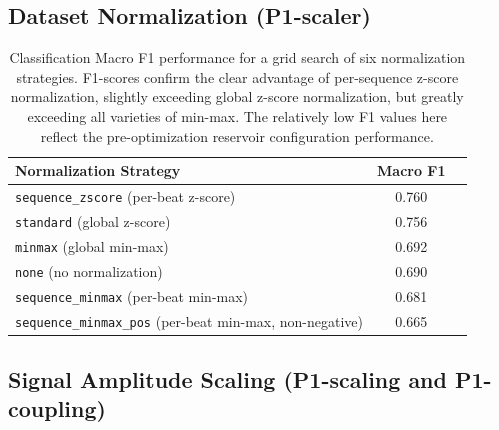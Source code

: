 \documentclass[journal=asbcd6,manuscript=suppinfo]{achemso}
\begin{document}
\subsection{Dataset Normalization (P1-scaler)}

\begin{table}[H]
    \centering
    \caption{Classification Macro F1 performance for a grid search of six normalization strategies. 
    F1-scores confirm the clear advantage of per-sequence z-score normalization, slightly exceeding global z-score normalization, but greatly exceeding all varieties of min-max.
    The relatively low F1 values here reflect the pre-optimization reservoir configuration performance.}
    \label{tab:P1-scaler}
    \small
    \begin{tabular}{lcc}
        \toprule
        Normalization Strategy & Macro F1 \\
        \midrule
        \texttt{sequence\_zscore} (per-beat z-score) & 0.760 \\
        \texttt{standard} (global z-score) & 0.756 \\
        \texttt{minmax} (global min-max) & 0.692 \\
        \texttt{none} (no normalization) & 0.690\\
        \texttt{sequence\_minmax} (per-beat min-max) & 0.681 \\
        \texttt{sequence\_minmax\_pos} (per-beat min-max, non-negative) & 0.665 \\
        \bottomrule
    \end{tabular}
\end{table}

\subsection{Signal Amplitude Scaling (P1-scaling and P1-coupling)}
\end{document}
